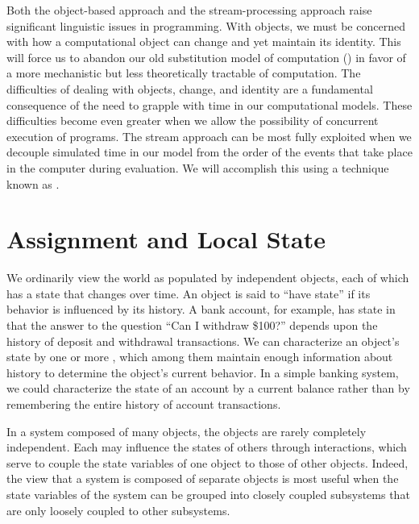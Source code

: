 Both the object-based approach and the stream-processing approach raise
significant linguistic issues in programming.  With objects, we must be
concerned with how a computational object can change and yet maintain its
identity.  This will force us to abandon our old substitution model of
computation () in favor of a more mechanistic but less
theoretically tractable  of computation.  The
difficulties of dealing with objects, change, and identity are a fundamental
consequence of the need to grapple with time in our computational models.
These difficulties become even greater when we allow the possibility of
concurrent execution of programs.  The stream approach can be most fully
exploited when we decouple simulated time in our model from the order of the
events that take place in the computer during evaluation.  We will accomplish
this using a technique known as .



\section{Assignment and Local State}
\label{Section 3.1}

We ordinarily view the world as populated by independent objects, each of which
has a state that changes over time.  An object is said to ``have state'' if its
behavior is influenced by its history.  A bank account, for example, has state
in that the answer to the question ``Can I withdraw \$100?''  depends upon the
history of deposit and withdrawal transactions.  We can characterize an
object's state by one or more , which among them
maintain enough information about history to determine the object's current
behavior.  In a simple banking system, we could characterize the state of an
account by a current balance rather than by remembering the entire history of
account transactions.

In a system composed of many objects, the objects are rarely completely
independent.  Each may influence the states of others through interactions,
which serve to couple the state variables of one object to those of other
objects.  Indeed, the view that a system is composed of separate objects is
most useful when the state variables of the system can be grouped into closely
coupled subsystems that are only loosely coupled to other subsystems.


